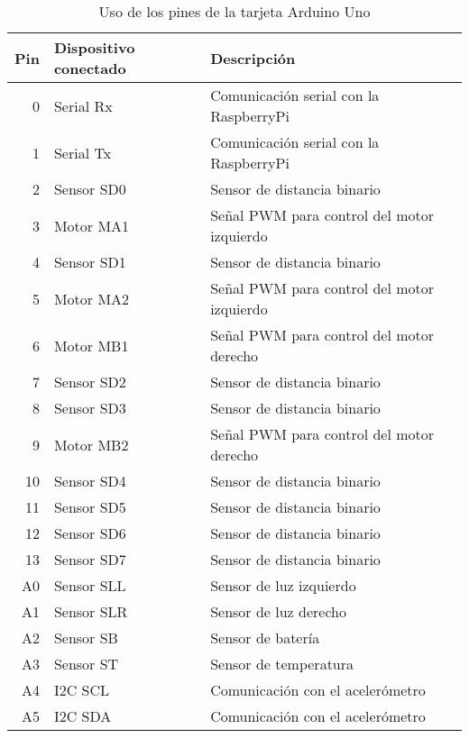 \documentclass[a4paper,12pt]{article}
\begin{document}
\begin{table}
\centering
\begin{tabular}{rll}
\hline
Pin & Dispositivo conectado & Descripción\\
\hline
0 & Serial Rx  & Comunicación serial con la RaspberryPi\\
1 & Serial Tx  & Comunicación serial con la RaspberryPi\\
2 & Sensor SD0 & Sensor de distancia binario\\
3 & Motor MA1  & Señal PWM para control del motor izquierdo\\
4 & Sensor SD1 & Sensor de distancia binario\\
5 & Motor MA2  & Señal PWM para control del motor izquierdo\\
6 & Motor MB1  & Señal PWM para control del motor derecho\\
7 & Sensor SD2 & Sensor de distancia binario\\
8 & Sensor SD3 & Sensor de distancia binario\\
9 & Motor MB2  & Señal PWM para control del motor derecho\\
10& Sensor SD4 & Sensor de distancia binario\\
11& Sensor SD5 & Sensor de distancia binario\\
12& Sensor SD6 & Sensor de distancia binario\\
13& Sensor SD7 & Sensor de distancia binario\\
A0& Sensor SLL & Sensor de luz izquierdo\\
A1& Sensor SLR & Sensor de luz derecho\\
A2& Sensor SB  & Sensor de batería\\
A3& Sensor ST  & Sensor de temperatura\\
A4& I2C SCL    & Comunicación con el acelerómetro\\
A5& I2C SDA    & Comunicación con el acelerómetro\\
\hline
\end{tabular}
\caption{Uso de los pines de la tarjeta Arduino Uno}
\label{tab:PinUsage}
\end{table}
\end{document}
